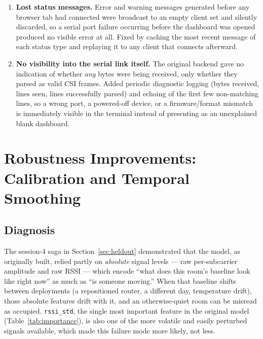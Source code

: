 \documentclass[11pt,a4paper]{article}
\begin{document}
\begin{enumerate}
    \item \textbf{Lost status messages.} Error and warning messages
    generated before any browser tab had connected were broadcast to an
    empty client set and silently discarded, so a serial port failure
    occurring before the dashboard was opened produced no visible error
    at all. Fixed by caching the most recent message of each status type
    and replaying it to any client that connects afterward.
    \item \textbf{No visibility into the serial link itself.} The
    original backend gave no indication of whether \emph{any} bytes were
    being received, only whether they parsed as valid CSI frames. Added
    periodic diagnostic logging (bytes received, lines seen, lines
    successfully parsed) and echoing of the first few non-matching
    lines, so a wrong port, a powered-off device, or a firmware/format
    mismatch is immediately visible in the terminal instead of
    presenting as an unexplained blank dashboard.
\end{enumerate}

\section{Robustness Improvements: Calibration and Temporal Smoothing}
\label{sec:calibration}

\subsection{Diagnosis}

The session-4 saga in Section~\ref{sec:heldout} demonstrated that the
model, as originally built, relied partly on \emph{absolute} signal
levels --- raw per-subcarrier amplitude and raw RSSI --- which encode
``what does this room's baseline look like right now'' as much as ``is
someone moving.'' When that baseline shifts between deployments (a
repositioned router, a different day, temperature drift), those absolute
features drift with it, and an otherwise-quiet room can be misread as
occupied. \texttt{rssi\_std}, the single most important feature in the
original model (Table~\ref{tab:importance}), is also one of the more
volatile and easily perturbed signals available, which made this failure
mode more likely, not less.
\end{document}
